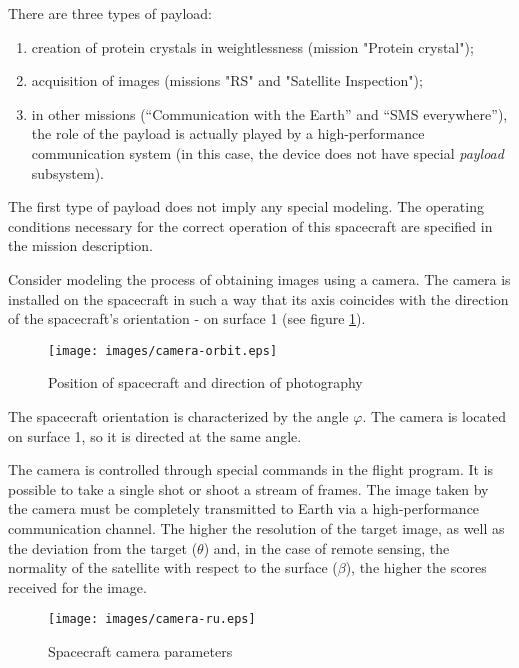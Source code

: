 \documentclass[12pt,a4paper]{article}
\begin{document}
There are three types of payload:

\begin{enumerate}
\item creation of protein crystals in weightlessness (mission "Protein crystal");
\item acquisition of images (missions "RS" and "Satellite Inspection");
\item in other missions (“Communication with the Earth” and “SMS everywhere”), the role of the payload is actually played by a high-performance communication system (in this case, the device does not have
   special \emph{payload} subsystem).
\end{enumerate}

The first type of payload does not imply any special modeling. The operating conditions necessary for the correct operation of this spacecraft are specified in the mission description.

Consider modeling the process of obtaining images using a camera. The camera is installed on the spacecraft in such a way that its axis coincides with the direction of the spacecraft's orientation - on surface 1 (see figure \ref{Pic:Camera-Orbit}).

\begin{figure}[tbh]
  \begin{center}
    \texttt{[image: images/camera-orbit.eps]}
    \caption{Position of spacecraft and direction of photography}
    \label{Pic:Camera-Orbit}
  \end{center}
\end{figure}

The spacecraft orientation is characterized by the angle $\varphi$. The camera is located on surface 1, so it is directed at the same angle.

The camera is controlled through special commands in the flight program. It is possible to take a single shot or shoot a stream of frames. The image taken by the camera must be completely transmitted to Earth via a high-performance communication channel. The higher the resolution of the target image, as well as the deviation from the target ($\theta$) and, in the case of remote sensing, the normality of the satellite with respect to the surface ($\beta$), the higher the scores received for the image.

\begin{figure}[tbh]
  \begin{center}
    \texttt{[image: images/camera-ru.eps]}
    \caption{Spacecraft camera parameters}
    \label{Pic:Camera}
  \end{center}
\end{figure}
\end{document}
